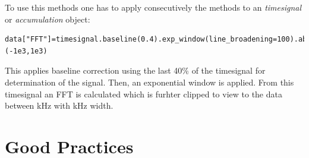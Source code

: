 \documentclass[12pt, a4paper, BCOR10mm, twoside, titlepage, headinclude]{scrbook}
\begin{document}
To use this methods one has to apply consecutively the methods to an \emph{timesignal} or \emph{accumulation} object:
\begin{lstlisting}[label=fftex]
data["FFT"]=timesignal.baseline(0.4).exp_window(line_broadening=100).abs_fft().clip=(-1e3,1e3)
\end{lstlisting}

This applies baseline correction using the last 40\% of the timesignal for determination of the signal. Then, an exponential window is applied. From this timesignal an FFT is calculated which is furhter clipped to view to the data between \unit[-1]{kHz} with \unit[1]{kHz} width.

\section{Good Practices}
\end{document}
